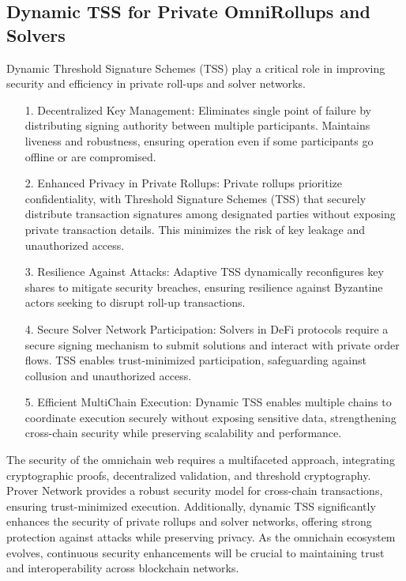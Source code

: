 \subsection{Dynamic TSS for Private OmniRollups and Solvers}
Dynamic Threshold Signature Schemes (TSS) play a critical role in improving security and efficiency in private roll-ups and solver networks. 
\begin{itemize}
    \item[1.] Decentralized Key Management: Eliminates single point of failure by distributing signing authority between multiple participants. Maintains liveness and robustness, ensuring operation even if some participants go offline or are compromised.

    \item[2.] Enhanced Privacy in Private Rollups: Private rollups prioritize confidentiality, with Threshold Signature Schemes (TSS) that securely distribute transaction signatures among designated parties without exposing private transaction details. This minimizes the risk of key leakage and unauthorized access.
    
    \item[3.] Resilience Against Attacks: Adaptive TSS dynamically reconfigures key shares to mitigate security breaches, ensuring resilience against Byzantine actors seeking to disrupt roll-up transactions.

    \item[4.] Secure Solver Network Participation: Solvers in DeFi protocols require a secure signing mechanism to submit solutions and interact with private order flows. TSS enables trust-minimized participation, safeguarding against collusion and unauthorized access.

    \item[5.] Efficient MultiChain Execution: Dynamic TSS enables multiple chains to coordinate execution securely without exposing sensitive data, strengthening cross-chain security while preserving scalability and performance.
\end{itemize}
The security of the omnichain web requires a multifaceted approach, integrating cryptographic proofs, decentralized validation, and threshold cryptography. Prover Network provides a robust security model for cross-chain transactions, ensuring trust-minimized execution. Additionally, dynamic TSS significantly enhances the security of private rollups and solver networks, offering strong protection against attacks while preserving privacy. As the omnichain ecosystem evolves, continuous security enhancements will be crucial to maintaining trust and interoperability across blockchain networks.
